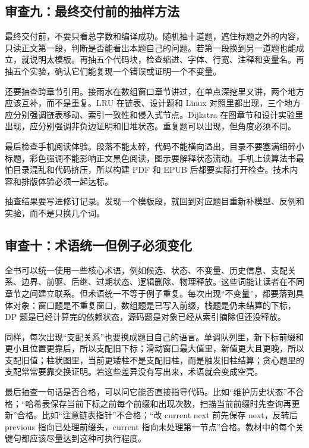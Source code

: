 \subsection{审查九：最终交付前的抽样方法}

最终交付前，不要只看总字数和编译成功。随机抽十道题，遮住标题之外的内容，只读正文第一段，判断是否能看出本题自己的问题。若第一段换到另一道题也能成立，就说明太模板。再抽五个代码块，检查缩进、字体、行宽、注释和变量名。再抽五个实验，确认它们能复现一个错误或证明一个不变量。

还要抽查跨章节引用。接雨水在数组窗口章节讲过，在单点深挖里又讲，两个地方应该互补，而不是重复。LRU 在链表、设计题和 Linux 对照里都出现，三个地方应分别强调链表移动、索引一致性和侵入式节点。Dijkstra 在图章节和设计实验里出现，应分别强调非负边证明和旧堆状态。重复题可以出现，但角度必须不同。

最后检查手机阅读体验。段落不能太碎，代码不能横向溢出，目录不要塞满细碎小标题，彩色强调不能影响正文黑色阅读，图示要解释状态流动。手机上读算法书最怕目录混乱和代码挤压，所以构建 PDF 和 EPUB 后都要实际打开检查。技术内容和排版体验必须一起达标。

抽查结果要写进修订记录。发现一个模板段，就回到对应题目重新补模型、反例和实验，而不是只换几个词。

\subsection{审查十：术语统一但例子必须变化}

全书可以统一使用一些核心术语，例如候选、状态、不变量、历史信息、支配关系、边界、前驱、后继、过期状态、逻辑删除、物理释放。这些词能让读者在不同章节之间建立联系。但术语统一不等于例子重复。每次出现“不变量”，都要落到具体对象：窗口题是不重复窗口，数组题是已写入前缀，栈题是仍未结算的下标，DP 题是已经计算完的依赖状态，源码题是对象已经从索引摘除但还没释放。

同样，每次出现“支配关系”也要换成题目自己的语言。单调队列里，新下标前缀和更小且位置更靠后，所以支配旧下标；滑动窗口最大值里，新值更大且更晚，所以支配旧值；柱状图里，当前更矮柱不是支配旧柱，而是触发旧柱结算；贪心题里的支配常常要靠交换证明。若这些差异没有写出来，术语就会变成空壳。

最后抽查一句话是否合格，可以问它能否直接指导代码。比如“维护历史状态”不合格；“哈希表保存当前下标之前每个前缀和出现次数，扫描当前前缀时先查询再更新”合格。比如“注意链表指针”不合格；“改 current next 前先保存 next，反转后 previous 指向已处理前缀头，current 指向未处理第一节点”合格。教材中的每个关键句都应该尽量达到这种可执行程度。

